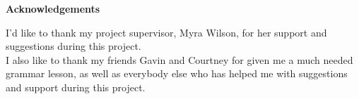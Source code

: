 \thispagestyle{empty}

\begin{center}
    {\LARGE\bf Acknowledgements}
\end{center}

I'd like to thank my project supervisor, Myra Wilson, for her support and suggestions during this project. \\
I also like to thank my friends Gavin and Courtney for given me a much needed grammar lesson, as well as everybody else who has helped me with suggestions and support during this project.

